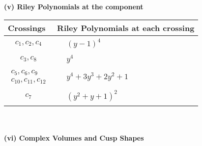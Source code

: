 \documentclass[1p]{elsarticle_modified}
\theoremstyle{definition}
\begin{document}
\newpage\renewcommand{\arraystretch}{1}
\flushleft \textbf{(v) Riley Polynomials at the component}\newline \\
\begin{tabular}{m{50pt}|m{274pt}}
Crossings & \hspace{64pt}Riley Polynomials at each crossing \\
\hline $$\begin{aligned}c_{1},c_{2},c_{4}\end{aligned}$$&$\begin{aligned}
&(y-1)^4
\end{aligned}$\\
\hline $$\begin{aligned}c_{3},c_{8}\end{aligned}$$&$\begin{aligned}
&y^4
\end{aligned}$\\
\hline $$\begin{aligned}c_{5},c_{6},c_{9}\\c_{10},c_{11},c_{12}\end{aligned}$$&$\begin{aligned}
&y^4+3 y^3+2 y^2+1
\end{aligned}$\\
\hline $$\begin{aligned}c_{7}\end{aligned}$$&$\begin{aligned}
&(y^2+y+1)^2
\end{aligned}$\\
\hline
\end{tabular}\\~\\
\newpage\flushleft \textbf{(vi) Complex Volumes and Cusp Shapes}
\end{document}
